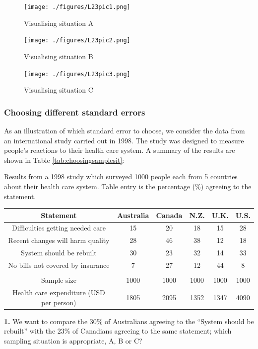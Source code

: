 \documentclass[
  oneside]{krantz}
\begin{document}
\begin{figure}[htbp]
\centering
\texttt{[image: ./figures/L23pic1.png]}
\caption{Visualising situation A\label{L23pic1}}
\end{figure}

\begin{figure}[htbp]
\centering
\texttt{[image: ./figures/L23pic2.png]}
\caption{Visualising situation B\label{L23pic2}}
\end{figure}

\begin{figure}[htbp]
\centering
\texttt{[image: ./figures/L23pic3.png]}
\caption{Visualising situation C\label{L23pic3}}
\end{figure}

\hypertarget{choosing-different-standard-errors}{%
\subsubsection{Choosing different standard errors}\label{choosing-different-standard-errors}}

As an illustration of which standard error to choose, we consider the data from an international study carried out in 1998. The study was designed to measure people's reactions to their health care system. A summary of the results are shown in Table \ref{tab:choosingsamplesit}:

\label{tab:choosingsamplesit} Results from a 1998 study which surveyed 1000 people each from 5 countries
about their health care system. Table entry is the percentage (\%) agreeing to the statement.

\begin{longtable}[]{@{}cccccc@{}}
\toprule
Statement & Australia & Canada & N.Z. & U.K. & U.S.\tabularnewline
\midrule
\endhead
Difficulties getting needed care & 15 & 20 & 18 & 15 & 28\tabularnewline
Recent changes will harm quality & 28 & 46 & 38 & 12 & 18\tabularnewline
System should be rebuilt & 30 & 23 & 32 & 14 & 33\tabularnewline
No bills not covered by insurance & 7 & 27 & 12 & 44 & 8\tabularnewline
& & & & &\tabularnewline
Sample size & 1000 & 1000 & 1000 & 1000 & 1000\tabularnewline
Health care expenditure (USD per person) & 1805 & 2095 & 1352 & 1347 & 4090\tabularnewline
\bottomrule
\end{longtable}

\textbf{1.} We want to compare the 30\% of Australians agreeing to the ``System should be rebuilt'' with the 23\% of Canadians agreeing to the same statement; which sampling situation is appropriate, A, B or C?
\end{document}
